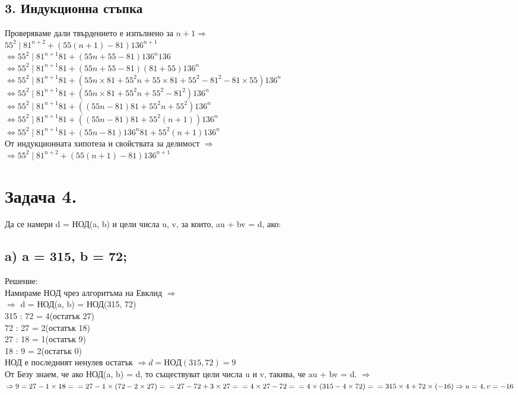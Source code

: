 \documentclass[12pt]{article}
\begin{document}
\subsection*{3. Индукционна стъпка}
Проверяваме дали твърдението е изпълнено за $n+1 \Rightarrow$\\
$55^2 \mid 81^{n+2} + (55(n + 1) -81)136^{n+1}$\\
$\Leftrightarrow 55^2 \mid 81^{n + 1}81 + (55n + 55 - 81)136^n136$\\
$\Leftrightarrow 55^2 \mid 81^{n + 1}81 + (55n + 55 - 81)(81 + 55)136^n$\\
$\Leftrightarrow 55^2 \mid 81^{n + 1}81 + (55n \times 81 + 55^2n + 55 \times 81 + 55^2 - 81^2 - 81 \times 55)136^n$\\
$\Leftrightarrow 55^2 \mid 81^{n + 1}81 + (55n \times 81 + 55^2n + 55^2 - 81^2)136^n$\\
$\Leftrightarrow 55^2 \mid 81^{n + 1}81 + ((55n - 81)81  + 55^2n + 55^2)136^n$\\
$\Leftrightarrow 55^2 \mid 81^{n + 1}81 + ((55n - 81)81  + 55^2(n + 1))136^n$\\
$\Leftrightarrow 55^2 \mid 81^{n + 1}81 + (55n - 81)136^n81  + 55^2(n + 1)136^n$\\
От индукционната хипотеза и свойствата за делимост $\Rightarrow$\\
$\Rightarrow 55^2 \mid 81^{n+2} + (55(n + 1) -81)136^{n+1}$

\section*{Задача 4.}
Да се намери d = НОД(a, b) и цели числа u, v, за които, au + bv = d, ако:\\
\subsection*{a) a = 315, b = 72;}
Решение:\\
Намираме НОД чрез алгоритъма на Евклид $\Rightarrow$\\
$\Rightarrow$ d = НОД(a, b) = НОД(315, 72)\\
315 : 72 = 4(остатък 27)\\
72 : 27 = 2(остатък 18)\\
27 : 18 = 1(остатък 9)\\
18 : 9 = 2(остатък 0)\\
НОД е последният ненулев остатък $\Rightarrow d = НОД(315, 72) = 9$\\
От Безу знаем, че ако НОД(a, b) = d, то съществуват цели числа u и v, такива, че au + bv = d. $\Rightarrow$\\
$\Rightarrow 9 = 27 - 1 \times 18 =\\
= 27 - 1 \times (72 - 2 \times 27) =\\
= 27 - 72 + 3 \times 27 =\\
= 4 \times 27 - 72 =\\
= 4 \times (315 - 4 \times 72) =\\
= 315 \times 4 + 72 \times (-16)\\
\Rightarrow u = 4, v = -16$
\end{document}
